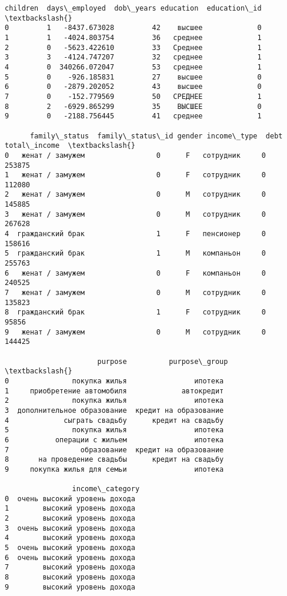 \documentclass[11pt]{article}
\newcommand{\prompt}[4]{
        \llap{{\color{#2}[#3]: #4}}\vspace{-1.25em}
    }
\begin{document}
            \begin{tcolorbox}[breakable, boxrule=.5pt, size=fbox, pad at break*=1mm, opacityfill=0]
\prompt{Out}{outcolor}{34}{\hspace{3.5pt}}
\begin{Verbatim}[commandchars=\\\{\}]
   children  days\_employed  dob\_years education  education\_id  \textbackslash{}
0         1   -8437.673028         42    высшее             0
1         1   -4024.803754         36   среднее             1
2         0   -5623.422610         33   Среднее             1
3         3   -4124.747207         32   среднее             1
4         0  340266.072047         53   среднее             1
5         0    -926.185831         27    высшее             0
6         0   -2879.202052         43    высшее             0
7         0    -152.779569         50   СРЕДНЕЕ             1
8         2   -6929.865299         35    ВЫСШЕЕ             0
9         0   -2188.756445         41   среднее             1

      family\_status  family\_status\_id gender income\_type  debt  total\_income  \textbackslash{}
0   женат / замужем                 0      F   сотрудник     0        253875
1   женат / замужем                 0      F   сотрудник     0        112080
2   женат / замужем                 0      M   сотрудник     0        145885
3   женат / замужем                 0      M   сотрудник     0        267628
4  гражданский брак                 1      F   пенсионер     0        158616
5  гражданский брак                 1      M   компаньон     0        255763
6   женат / замужем                 0      F   компаньон     0        240525
7   женат / замужем                 0      M   сотрудник     0        135823
8  гражданский брак                 1      F   сотрудник     0         95856
9   женат / замужем                 0      M   сотрудник     0        144425

                      purpose          purpose\_group  \textbackslash{}
0               покупка жилья                ипотека
1     приобретение автомобиля             автокредит
2               покупка жилья                ипотека
3  дополнительное образование  кредит на образование
4             сыграть свадьбу      кредит на свадьбу
5               покупка жилья                ипотека
6           операции с жильем                ипотека
7                 образование  кредит на образование
8       на проведение свадьбы      кредит на свадьбу
9     покупка жилья для семьи                ипотека

                income\_category
0  очень высокий уровень дохода
1        высокий уровень дохода
2        высокий уровень дохода
3  очень высокий уровень дохода
4        высокий уровень дохода
5  очень высокий уровень дохода
6  очень высокий уровень дохода
7        высокий уровень дохода
8        высокий уровень дохода
9        высокий уровень дохода
\end{Verbatim}
\end{tcolorbox}
        
\end{document}
